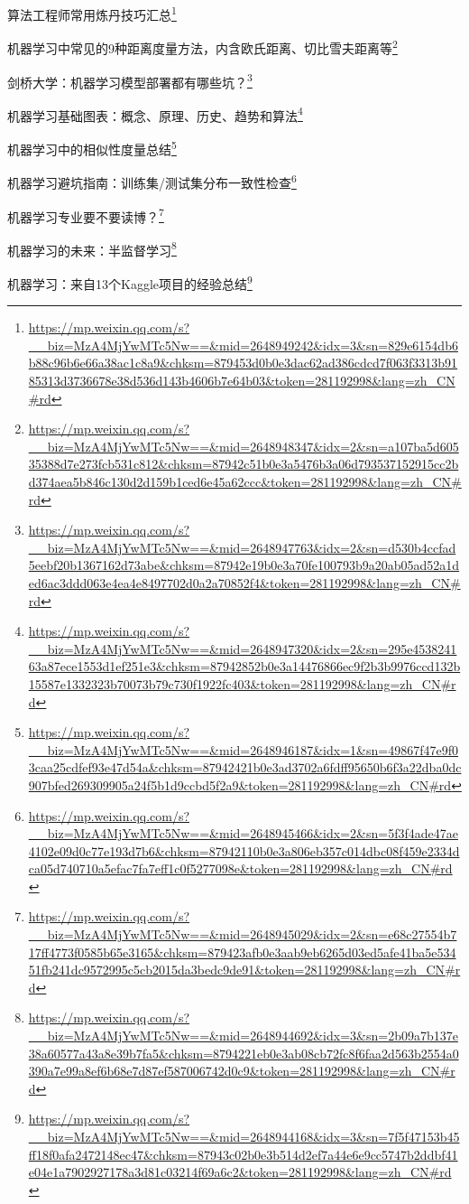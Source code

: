 \documentclass[]{ctexbook}
\renewcommand{\href}[2]{#2\footnote{\url{#1}}}
\begin{document}
\href{https://mp.weixin.qq.com/s?__biz=MzA4MjYwMTc5Nw==\&mid=2648949242\&idx=3\&sn=829e6154db6b88c96b6e66a38ac1c8a9\&chksm=879453d0b0e3dac62ad386cdcd7f063f3313b9185313d3736678e38d536d143b4606b7e64b03\&token=281192998\&lang=zh_CN\#rd}{算法工程师常用炼丹技巧汇总}

\href{https://mp.weixin.qq.com/s?__biz=MzA4MjYwMTc5Nw==\&mid=2648948347\&idx=2\&sn=a107ba5d60535388d7e273fcb531c812\&chksm=87942c51b0e3a5476b3a06d793537152915cc2bd374aea5b846c130d2d159b1ced6e45a62ccc\&token=281192998\&lang=zh_CN\#rd}{机器学习中常见的9种距离度量方法，内含欧氏距离、切比雪夫距离等}

\href{https://mp.weixin.qq.com/s?__biz=MzA4MjYwMTc5Nw==\&mid=2648947763\&idx=2\&sn=d530b4ccfad5eebf20b1367162d73abe\&chksm=87942e19b0e3a70fe100793b9a20ab05ad52a1ded6ac3ddd063e4ea4e8497702d0a2a70852f4\&token=281192998\&lang=zh_CN\#rd}{剑桥大学：机器学习模型部署都有哪些坑？}

\href{https://mp.weixin.qq.com/s?__biz=MzA4MjYwMTc5Nw==\&mid=2648947320\&idx=2\&sn=295e453824163a87ece1553d1ef251e3\&chksm=87942852b0e3a14476866ec9f2b3b9976ccd132b15587e1332323b70073b79c730f1922fc403\&token=281192998\&lang=zh_CN\#rd}{机器学习基础图表：概念、原理、历史、趋势和算法}

\href{https://mp.weixin.qq.com/s?__biz=MzA4MjYwMTc5Nw==\&mid=2648946187\&idx=1\&sn=49867f47e9f03caa25cdfef93e47d54a\&chksm=87942421b0e3ad3702a6fdff95650b6f3a22dba0dc907bfed269309905a24f5b1d9ccbd5f2a9\&token=281192998\&lang=zh_CN\#rd}{机器学习中的相似性度量总结}

\href{https://mp.weixin.qq.com/s?__biz=MzA4MjYwMTc5Nw==\&mid=2648945466\&idx=2\&sn=5f3f4ade47ae4102e09d0c77e193d7b6\&chksm=87942110b0e3a806eb357c014dbc08f459e2334dca05d740710a5efac7fa7eff1c0f5277098e\&token=281192998\&lang=zh_CN\#rd}{机器学习避坑指南：训练集/测试集分布一致性检查}

\href{https://mp.weixin.qq.com/s?__biz=MzA4MjYwMTc5Nw==\&mid=2648945029\&idx=2\&sn=e68c27554b717ff4773f0585b65e3165\&chksm=879423afb0e3aab9eb6265d03ed5afe41ba5e53451fb241dc9572995c5cb2015da3bedc9de91\&token=281192998\&lang=zh_CN\#rd}{机器学习专业要不要读博？}

\href{https://mp.weixin.qq.com/s?__biz=MzA4MjYwMTc5Nw==\&mid=2648944692\&idx=3\&sn=2b09a7b137e38a60577a43a8e39b7fa5\&chksm=8794221eb0e3ab08cb72fc8f6faa2d563b2554a0390a7e99a8ef6b68e7d87ef587006742d0c9\&token=281192998\&lang=zh_CN\#rd}{机器学习的未来：半监督学习}

\href{https://mp.weixin.qq.com/s?__biz=MzA4MjYwMTc5Nw==\&mid=2648944168\&idx=3\&sn=7f5f47153b45ff18f0afa2472148ec47\&chksm=87943c02b0e3b514d2ef7a44e6e9cc5747b2ddbf41e04e1a7902927178a3d81c03214f69a6c2\&token=281192998\&lang=zh_CN\#rd}{机器学习：来自13个Kaggle项目的经验总结}
\end{document}
